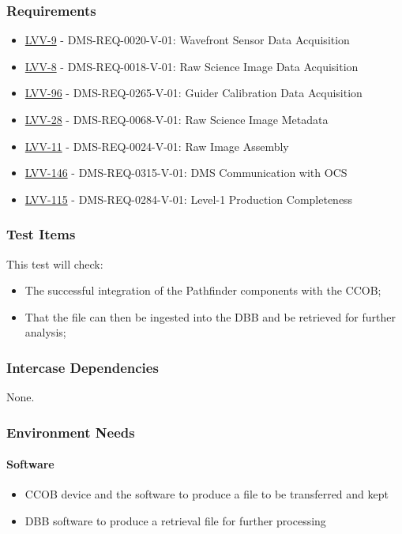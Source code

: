 \subsubsection{Requirements}
\begin{itemize}
\item \href{https://jira.lsstcorp.org/browse/LVV-9}{LVV-9} - DMS-REQ-0020-V-01: Wavefront Sensor Data Acquisition
\item \href{https://jira.lsstcorp.org/browse/LVV-8}{LVV-8} - DMS-REQ-0018-V-01: Raw Science Image Data Acquisition
\item \href{https://jira.lsstcorp.org/browse/LVV-96}{LVV-96} - DMS-REQ-0265-V-01: Guider Calibration Data Acquisition
\item \href{https://jira.lsstcorp.org/browse/LVV-28}{LVV-28} - DMS-REQ-0068-V-01: Raw Science Image Metadata
\item \href{https://jira.lsstcorp.org/browse/LVV-11}{LVV-11} - DMS-REQ-0024-V-01: Raw Image Assembly
\item \href{https://jira.lsstcorp.org/browse/LVV-146}{LVV-146} - DMS-REQ-0315-V-01: DMS Communication with OCS
\item \href{https://jira.lsstcorp.org/browse/LVV-115}{LVV-115} - DMS-REQ-0284-V-01: Level-1 Production Completeness
\end{itemize}

\subsubsection{Test Items}
This test will check:

\begin{itemize}
\tightlist
\item
  The successful integration of the Pathfinder components with the CCOB;
\item
  That the file can then be ingested into the DBB and be retrieved for
  further analysis;
\end{itemize}



\subsubsection{Intercase Dependencies}
None.


\subsubsection{Environment Needs}

\paragraph{Software}
\begin{itemize}
\tightlist
\item
  CCOB device and the software to produce a file to be transferred and
  kept
\item
  DBB software to produce a retrieval file for further processing
\end{itemize}


